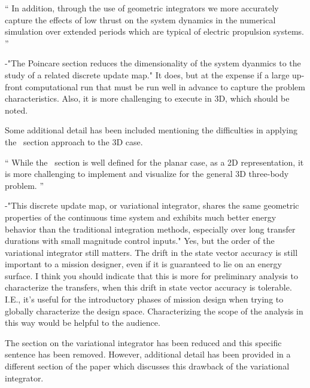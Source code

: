 \documentclass[11pt]{article}
\newenvironment{correction}{\begin{list}{}{\setlength{\leftmargin}{1cm}\setlength{\rightmargin}{1cm}}\vspace{\parsep}\item[]``}{''\end{list}}
\begin{document}
\begin{enumerate}
\begin{correction}
In addition, through the use of geometric integrators we more accurately capture the effects of low thrust on the system dynamics in the numerical simulation over extended periods which are typical of electric propulsion systems. 
\end{correction}

\item 
    \begin{itshape}
-"The Poincare section reduces the dimensionality of the system dyanmics to the study of a related discrete update map." It does, but at the expense if a large up-front computational run that must be run well in advance to capture the problem characteristics.  Also, it is more challenging to execute in 3D, which should be noted.
\end{itshape}

Some additional detail has been included mentioning the difficulties in applying the \Poincare~section approach to the 3D case.

\begin{correction}
While the \Poincare~section is well defined for the planar case, as a 2D representation, it is more challenging to implement and visualize for the general 3D three-body problem.
\end{correction}

\item
    \begin{itshape}
-"This discrete update map, or variational integrator, shares the same geometric properties of the continuous time system and exhibits much better energy behavior than the traditional integration methods, especially over long transfer durations with small magnitude control inputs."  Yes, but the order of the variational integrator still matters.  The drift in the state vector accuracy is still important to a mission designer, even if it is guaranteed to lie on an energy surface.  I think you should indicate that this is more for preliminary analysis to characterize the transfers, when this drift in state vector accuracy is tolerable.  I.E., it's useful for the introductory phases of mission design when trying to globally characterize the design space.  Characterizing the scope of the analysis in this way would be helpful to the audience.
\end{itshape}

The section on the variational integrator has been reduced and this specific sentence has been removed. 
However, additional detail has been provided in a different section of the paper which discusses this drawback of the variational integrator.


\end{enumerate}
\end{document}
